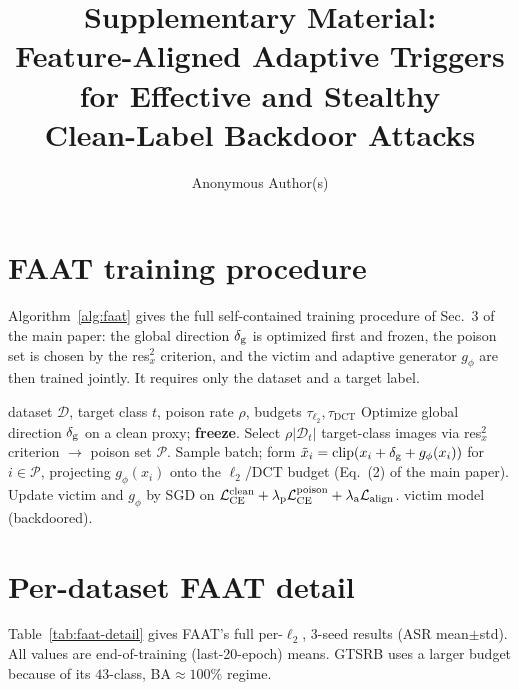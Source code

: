 \documentclass[10pt,twocolumn,letterpaper]{article}
\title{Supplementary Material:\\
Feature-Aligned Adaptive Triggers for Effective and Stealthy\\
Clean-Label Backdoor Attacks}
\author{Anonymous Author(s)}
\begin{document}
\maketitle

\section{FAAT training procedure}
\label{sec:alg-supp}
Algorithm~\ref{alg:faat} gives the full self-contained training procedure of
Sec.~3 of the main paper: the global direction $\delta_{\mathrm{g}}$ is optimized first
and frozen, the poison set is chosen by the res$_x^2$ criterion, and the victim
and adaptive generator $g_\phi$ are then trained jointly. It requires only the
dataset and a target label.

\begin{algorithm}[h]
\caption{FAAT training (self-contained)}
\label{alg:faat}
\begin{algorithmic}[1]
\REQUIRE dataset $\mathcal{D}$, target class $t$, poison rate $\rho$, budgets $\tau_{\ell_2},\tau_{\mathrm{DCT}}$
\STATE Optimize global direction $\delta_{\mathrm{g}}$ on a clean proxy; \textbf{freeze}.
\STATE Select $\rho|\mathcal{D}_t|$ target-class images via res$_x^2$ criterion $\to$ poison set $\mathcal{P}$.
  \STATE Sample batch; form $\tilde{x}_i = \mathrm{clip}(x_i + \delta_{\mathrm{g}} + g_\phi(x_i))$ for $i\!\in\!\mathcal{P}$, projecting $g_\phi(x_i)$ onto the $\ell_2$/DCT budget (Eq.~(2) of the main paper).
  \STATE Update victim and $g_\phi$ by SGD on $\mathcal{L}_{\mathrm{CE}}^{\mathrm{clean}} + \lambda_{\mathrm{p}}\mathcal{L}_{\mathrm{CE}}^{\mathrm{poison}} + \lambda_{\mathrm{a}}\mathcal{L}_{\mathrm{align}}$.
\ENDFOR
\ENSURE victim model (backdoored).
\end{algorithmic}
\end{algorithm}

\section{Per-dataset FAAT detail}
\label{sec:faat-detail}
Table~\ref{tab:faat-detail} gives FAAT's full per-$\ell_2$, 3-seed results
(ASR mean$\pm$std). All values are end-of-training (last-20-epoch) means.
GTSRB uses a larger budget because of its $43$-class, BA$\approx\!100\%$ regime.
\end{document}
